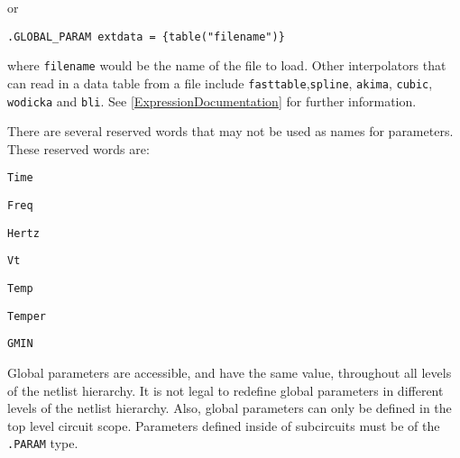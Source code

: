 \begin{Command}
or

\texttt{.GLOBAL\_PARAM extdata = \{table("filename")\}}

where \texttt{filename} would be the name of the file to load.  
Other interpolators that can read in a data table from a file 
include \texttt{fasttable},\texttt{spline}, \texttt{akima}, \texttt{cubic}, 
\texttt{wodicka} and \texttt{bli}.  See \ref{ExpressionDocumentation} 
for further information. 

There are several reserved words that may not be used as names for parameters.  These reserved words are:
\begin{XyceItemize}
\item \verb+Time+
\item \verb+Freq+ 
\item \verb+Hertz+ 
\item \verb+Vt+
\item \verb+Temp+
\item \verb+Temper+
\item \verb+GMIN+
\end{XyceItemize}

Global parameters are accessible, and have the same value, throughout all
levels of the netlist hierarchy.  It is not legal to redefine global parameters
in different levels of the netlist hierarchy.  Also, global parameters can only 
  be defined in the top level circuit scope.   Parameters defined inside of 
  subcircuits must be of the \texttt{.PARAM} type.

\end{Command}
